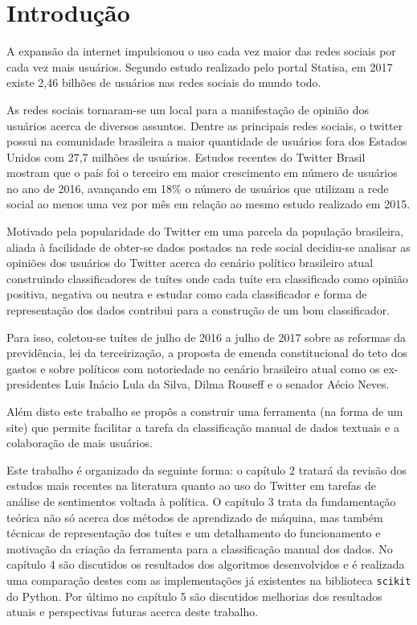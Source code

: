 \chapter{Introdução}

A expansão da internet impulsionou o uso cada vez maior das redes sociais por cada vez mais
usuários. Segundo estudo realizado pelo portal Statisa\cite{statisa}, em 2017 existe
2,46 bilhões de usuários nas redes sociais do mundo todo.

As redes sociais tornaram-se um local para a manifestação de opinião dos usuários acerca de
diversos assuntos. Dentre as principais redes sociais, o twitter possui na comunidade brasileira
a maior quantidade de usuários fora dos Estados Unidos com 27,7 milhões de usuários.
Estudos recentes do Twitter Brasil mostram que o país foi o terceiro em maior crescimento em número
de usuários no ano de 2016, avançando em 18\% o número de usuários que utilizam a rede social ao
menos uma vez por mês em relação ao mesmo estudo realizado em 2015.\cite{twitterFolha}

Motivado pela popularidade do Twitter em uma parcela da população brasileira, aliada à facilidade
de obter-se dados postados na rede social decidiu-se analisar as opiniões dos usuários do Twitter
acerca do cenário político brasileiro atual construindo classificadores de tuítes onde cada
tuíte era classificado como opinião positiva, negativa ou neutra e estudar como
cada classificador e forma de representação dos dados contribui para a construção de um bom
classificador. 

Para isso, coletou-se tuítes de julho de 2016 a julho de 2017 sobre as reformas da previdência, lei
da terceirização, a proposta de emenda constitucional do teto dos gastos e sobre políticos
com notoriedade no cenário brasileiro atual como os ex-presidentes Luis Inácio Lula da Silva,
Dilma Rouseff e o senador Aécio Neves.

Além disto este trabalho se propôs a construir uma ferramenta (na forma de um site) que permite
facilitar a tarefa da classificação manual de dados textuais e a colaboração de mais usuários.

Este trabalho é organizado da seguinte forma: o capítulo 2 tratará da revisão dos estudos mais
recentes na literatura quanto ao uso do Twitter em tarefas de análise de sentimentos voltada à
política. O capítulo 3 trata da fundamentação teórica não só acerca dos métodos de aprendizado de
máquina, mas também técnicas de representação dos tuítes e um detalhamento do funcionamento e motivação
da criação da ferramenta para a classificação manual dos dados. No capítulo 4 são discutidos os resultados
dos algoritmos desenvolvidos e é realizada uma comparação destes com as implementações já existentes
na biblioteca \texttt{scikit} do Python. Por último no capítulo 5 são discutidos melhorias dos resultados
atuais e perspectivas futuras acerca deste trabalho.
